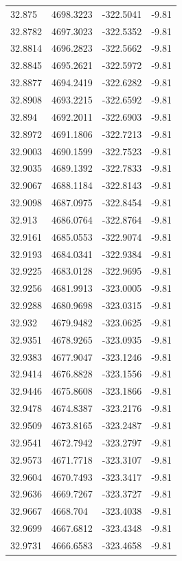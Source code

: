 \begin{table}[H]
\begin{tabular}{llll}
32.875 & 4698.3223 & -322.5041 & -9.81 \\
32.8782 & 4697.3023 & -322.5352 & -9.81 \\
32.8814 & 4696.2823 & -322.5662 & -9.81 \\
32.8845 & 4695.2621 & -322.5972 & -9.81 \\
32.8877 & 4694.2419 & -322.6282 & -9.81 \\
32.8908 & 4693.2215 & -322.6592 & -9.81 \\
32.894 & 4692.2011 & -322.6903 & -9.81 \\
32.8972 & 4691.1806 & -322.7213 & -9.81 \\
32.9003 & 4690.1599 & -322.7523 & -9.81 \\
32.9035 & 4689.1392 & -322.7833 & -9.81 \\
32.9067 & 4688.1184 & -322.8143 & -9.81 \\
32.9098 & 4687.0975 & -322.8454 & -9.81 \\
32.913 & 4686.0764 & -322.8764 & -9.81 \\
32.9161 & 4685.0553 & -322.9074 & -9.81 \\
32.9193 & 4684.0341 & -322.9384 & -9.81 \\
32.9225 & 4683.0128 & -322.9695 & -9.81 \\
32.9256 & 4681.9913 & -323.0005 & -9.81 \\
32.9288 & 4680.9698 & -323.0315 & -9.81 \\
32.932 & 4679.9482 & -323.0625 & -9.81 \\
32.9351 & 4678.9265 & -323.0935 & -9.81 \\
32.9383 & 4677.9047 & -323.1246 & -9.81 \\
32.9414 & 4676.8828 & -323.1556 & -9.81 \\
32.9446 & 4675.8608 & -323.1866 & -9.81 \\
32.9478 & 4674.8387 & -323.2176 & -9.81 \\
32.9509 & 4673.8165 & -323.2487 & -9.81 \\
32.9541 & 4672.7942 & -323.2797 & -9.81 \\
32.9573 & 4671.7718 & -323.3107 & -9.81 \\
32.9604 & 4670.7493 & -323.3417 & -9.81 \\
32.9636 & 4669.7267 & -323.3727 & -9.81 \\
32.9667 & 4668.704 & -323.4038 & -9.81 \\
32.9699 & 4667.6812 & -323.4348 & -9.81 \\
32.9731 & 4666.6583 & -323.4658 & -9.81 \\

\end{tabular}
\end{table}
